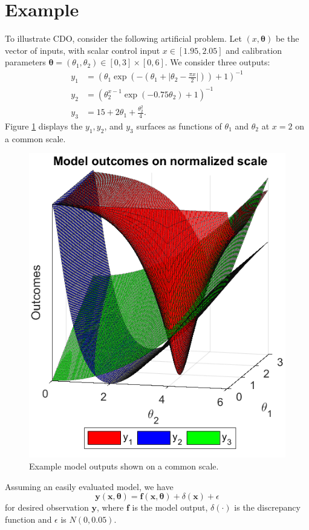 \documentclass{article}
\begin{document}
\section{Example}\label{example}
To illustrate CDO, consider the following artificial problem. 
%
Let $(x,\boldsymbol \theta)$ be the vector of inputs, with scalar control input $x\in[1.95,2.05]$ and calibration parameters $\boldsymbol \theta = (\theta_1,\theta_2)\in[0,3]\times[0,6]$.
%
We consider three outputs:
%
\begin{equation}\label{eq:toy_sim_outputs}
\begin{aligned}
y_1 &= \left(\theta_1 \exp\left(-\left(\theta_1 + \lvert \theta_2-\frac{\pi x}2\rvert \right)\right)+1\right)^{-1}\\
y_2 &= \left(\theta_2^{x-1} \exp\left(-0.75 \theta_2\right) + 1 \right)^{-1} \\
y_3 &= 15 + 2 \theta_1 + \frac{\theta_2^2}4.
\end{aligned}
\end{equation}
%
Figure \ref{fig:toy_sim_outputs} displays the $y_1, y_2$, and $y_3$ surfaces as functions of $\theta_1$ and $\theta_2$ at $x = 2$ on a common scale.
%
\begin{figure}
\centering
\includegraphics[width=.4\linewidth]{FIG_toy_sim_model_outputs}
\captionsetup{width=.4\linewidth}
\caption{Example model outputs shown on a common scale.}
\label{fig:toy_sim_outputs}
\end{figure}
%
Assuming an easily evaluated model, we have
%
\[
\mathbf y(\mathbf x, \boldsymbol\theta) = \mathbf f(\mathbf x,\boldsymbol \theta) + \delta(\mathbf x) + \epsilon
\]
%
for desired observation $\mathbf y$, where $\mathbf f$ is the model output, $\delta(\cdot)$ is the discrepancy function and $\epsilon$ is $N(0,0.05)$.
\end{document}
